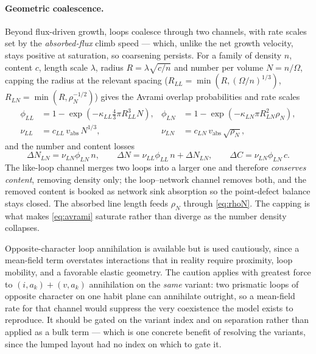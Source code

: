 \documentclass{article}
\begin{document}
\paragraph{Geometric coalescence.} Beyond flux-driven growth, loops coalesce
through two channels, with rate scales set by the \emph{absorbed-flux} climb
speed --- which, unlike the net growth velocity, stays positive at saturation, so
coarsening persists. For a family of density $n$, content $c$, length scale
$\lambda$, radius $R=\lambda\sqrt{c/n}$ and number per volume $N=n/\Omega$,
capping the radius at the relevant spacing ($R_{LL}=\min(R,(\Omega/n)^{1/3})$,
$R_{LN}=\min(R,\rho_N^{-1/2})$) gives the Avrami overlap probabilities and rate
scales
\begin{align}
\phi_{LL}&=1-\exp\!\left(-\kappa_{LL}\tfrac43\pi R_{LL}^3N\right), &
\phi_{LN}&=1-\exp\!\left(-\kappa_{LN}\pi R_{LN}^2\rho_N\right),\\
\nu_{LL}&=c_{LL}\,v_{\mathrm{abs}}\,N^{1/3}, &
\nu_{LN}&=c_{LN}\,v_{\mathrm{abs}}\,\sqrt{\rho_N},
\label{eq:avrami}
\end{align}
and the number and content losses
\begin{equation}
  \Delta N_{LN}=\nu_{LN}\phi_{LN}\,n,
  \qquad
  \Delta N=\nu_{LL}\phi_{LL}\,n+\Delta N_{LN},
  \qquad
  \Delta C=\nu_{LN}\phi_{LN}\,c .
  \label{eq:coal}
\end{equation}
The like-loop channel merges two loops into a larger one and therefore
\emph{conserves content}, removing density only; the loop--network channel
removes both, and the removed content is booked as network sink absorption so the
point-defect balance stays closed. The absorbed line length feeds $\rho_N$
through \cref{eq:rhoN}. The capping is what makes \cref{eq:avrami} saturate
rather than diverge as the number density collapses.

Opposite-character loop annihilation is available but is used cautiously, since a
mean-field term overstates interactions that in reality require proximity, loop
mobility, and a favorable elastic geometry. The caution applies with greatest
force to $(i,a_k)+(v,a_k)$ annihilation on the \emph{same} variant: two prismatic
loops of opposite character on one habit plane can annihilate outright, so a
mean-field rate for that channel would suppress the very coexistence the model
exists to reproduce. It should be gated on the variant index and on separation
rather than applied as a bulk term --- which is one concrete benefit of resolving
the variants, since the lumped layout had no index on which to gate it.
\end{document}
